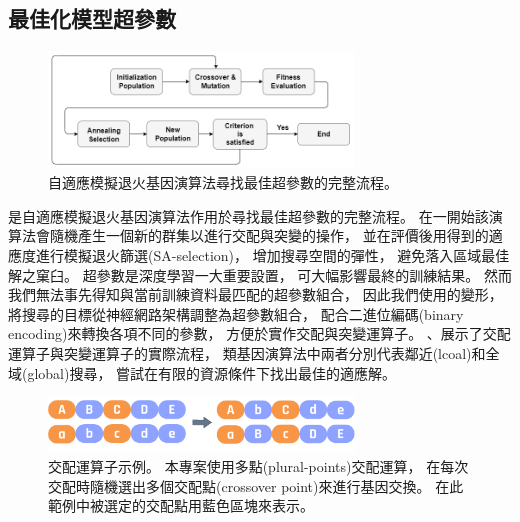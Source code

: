 \documentclass[a4paper,12pt]{extarticle}
\begin{document}
        \subsection{最佳化模型超參數}
            \begin{figure}[htb]
                \centering
                \includegraphics[width=0.725\textwidth]{SAGA_scheme.png}
                \caption{
                    自適應模擬退火基因演算法尋找最佳超參數的完整流程。
                }
                \label{fig:SAGA_scheme}
            \end{figure}
            是自適應模擬退火基因演算法作用於尋找最佳超參數的完整流程。
            在一開始該演算法會隨機產生一個新的群集以進行交配與突變的操作，
            並在評價後用得到的適應度進行模擬退火篩選(SA-selection)，
            增加搜尋空間的彈性，
            避免落入區域最佳解之窠臼。
            超參數是深度學習一大重要設置，
            可大幅影響最終的訓練結果。
            然而我們無法事先得知與當前訓練資料最匹配的超參數組合，
            因此我們使用的變形，
            將搜尋的目標從神經網路架構調整為超參數組合，
            配合二進位編碼(binary encoding)來轉換各項不同的參數，
            方便於實作交配與突變運算子。
            、展示了交配運算子與突變運算子的實際流程，
            類基因演算法中兩者分別代表鄰近(lcoal)和全域(global)搜尋，
            嘗試在有限的資源條件下找出最佳的適應解。
            \begin{figure}[htb]
                \centering
                \includegraphics[width=0.725\textwidth]{crossover.pdf}
                \caption{
                    交配運算子示例。
                    本專案使用多點(plural-points)交配運算，
                    在每次交配時隨機選出多個交配點(crossover point)來進行基因交換。
                    在此範例中被選定的交配點用藍色區塊來表示。
                }
                \label{fig:crossover}
            \end{figure}
\end{document}
